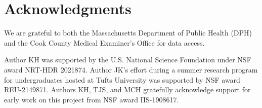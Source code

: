 \section{Acknowledgments}\label{acknowledgments}

We are grateful to both the Massachusetts Department of Public Health (DPH) and the Cook County Medical Examiner's Office for data access.

Author KH was supported by the U.S. National Science Foundation under NSF award NRT-HDR 2021874. Author JK's effort during a summer research program for undergraduates hosted at Tufts University was supported by NSF award REU-2149871. Authors KH, TJS, and MCH gratefully acknowledge support for early work on this project from NSF award IIS-1908617.
